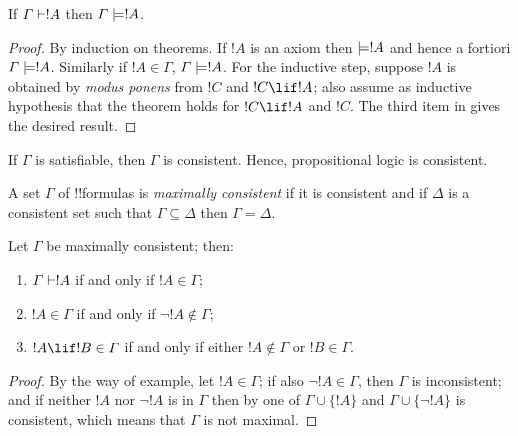 \documentclass[../../include/open-logic-section]{subfiles}
\begin{document}


\begin{thm}[Soundness] 
If $\Gamma\Proves!A$ then
$\Gamma \Entails !A$. 
\end{thm}

\begin{proof} 
By induction on theorems. If $!A$ is an axiom then $\Entails
!A$ and hence a fortiori $\Gamma \Entails!A$. Similarly if $!A \in \Gamma$,
$\Gamma \Entails!A$. For the inductive step, suppose $!A$ is obtained by
\emph{modus ponens} from $!C$ and $!C\lif!A$; also assume as inductive
hypothesis that the theorem holds for $!C\lif !A$ and $!C$. The third item
in  gives the desired result. 
\end{proof}

\begin{cor} 
If $\Gamma$ is satisfiable, then $\Gamma$ is consistent. Hence,
propositional logic is consistent. 
\end{cor}

\begin{defn} 
A set $\Gamma$ of !!{formula}s is \emph{maximally consistent} if it is
consistent and if $\Delta$ is a consistent set such that $\Gamma
\subseteq \Delta$ then $\Gamma = \Delta$.
\end{defn}

\begin{prop} 
Let $\Gamma$ be maximally consistent; then: 
\begin{enumerate} 
\item $\Gamma\Proves!A$ if and only if $!A\in\Gamma$; 
\item $!A\in\Gamma$ if and only if $\lnot!A\notin\Gamma$;
\item $!A\lif!B \in\Gamma$ if and only if either $!A\notin\Gamma$ or
$!B\in\Gamma$. 
\end{enumerate} 
\end{prop} 


\begin{proof} 
By the way of example, let $!A\in\Gamma$; if also $\lnot!A\in\Gamma$,
then $\Gamma$ is inconsistent; and if neither $!A$ nor $\lnot!A$ is in
$\Gamma$ then by  one of $\Gamma\cup\{!A\}$
and $\Gamma\cup\{\lnot!A\}$ is consistent, which means that $\Gamma$
is not maximal. 
\end{proof}
\end{document}
